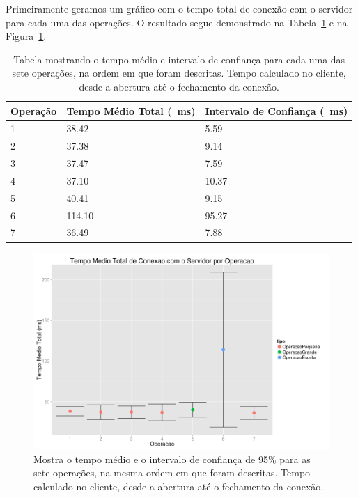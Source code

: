 \documentclass[12pt,a4paper]{article}
\begin{document}
Primeiramente geramos um gráfico com o tempo total de conexão com o servidor para cada uma das operações. O resultado segue demonstrado na Tabela~\ref{table:total} e na Figura~\ref{fig:total}.

\begin{table}[h]
\centering
\caption{Tabela mostrando o tempo médio e intervalo de confiança para cada uma das sete operações, na ordem em que foram descritas. Tempo calculado no cliente, desde a abertura até o fechamento da conexão.}
\label{table:total}
\begin{tabular}{lll}
Operação & Tempo Médio Total (\SI{}{\milli\second}) & Intervalo de Confiança (\SI{}{\milli\second})\\ \hline
1        & 38.42           & 5.59   \\
2        & 37.38           & 9.14   \\
3        & 37.47           & 7.59   \\
4        & 37.10           & 10.37  \\
5        & 40.41           & 9.15   \\
6        & 114.10          & 95.27  \\
7        & 36.49           & 7.88  
\end{tabular}
\end{table}

\begin{figure}[h]
\centering
\includegraphics[width=\textwidth]{diagrama/resultadosTempoTotal.png}
\caption{Mostra o tempo médio e o intervalo de confiança de 95\% para as sete operações, na mesma ordem em que foram descritas. Tempo calculado no cliente, desde a abertura até o fechamento da conexão.}
\label{fig:total}
\end{figure}
\end{document}
